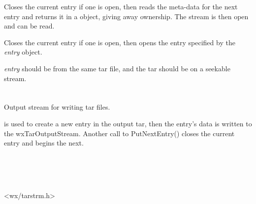 \label{wxtarinputstreamgetnextentry}


Closes the current entry if one is open, then reads the meta-data for
the next entry and returns it in a 
object, giving away ownership. The stream is then open and can be read.


\label{wxtarinputstreamopenentry}


Closes the current entry if one is open, then opens the entry specified
by the {\it entry} object.

{\it entry} should be from the same tar file, and the tar should
be on a seekable stream.




%
%

\section{}\label{wxtaroutputstream}

Output stream for writing tar files.

 is used to create
a new entry in the output tar, then the entry's data is written to the
wxTarOutputStream. Another call to PutNextEntry() closes the current
entry and begins the next.


\\
\\
\\


<wx/tarstrm.h>




